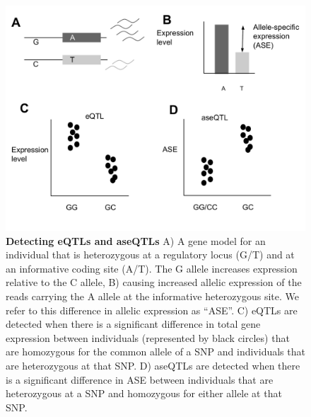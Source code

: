 \begin{figure}[!ht]
      \centering
       \includegraphics[width=\linewidth]{Ch3Fig1}
    \caption{\textbf{Detecting eQTLs and aseQTLs} A) A gene model for an individual that is heterozygous at a regulatory locus (G/T) and at an informative coding site (A/T). The G allele increases expression relative to the C allele, B) causing increased allelic expression of the reads carrying the A allele at the informative heterozygous site. We refer to this difference in allelic expression as “ASE”. C) eQTLs are detected when there is a significant difference in total gene expression between individuals (represented by black circles) that are homozygous for the common allele of a SNP and individuals that are heterozygous at that SNP. D) aseQTLs are detected when there is a significant difference in ASE between individuals that are heterozygous at a SNP and homozygous for either allele at that SNP.}
    \label{fig:3fig1}
\end{figure}



